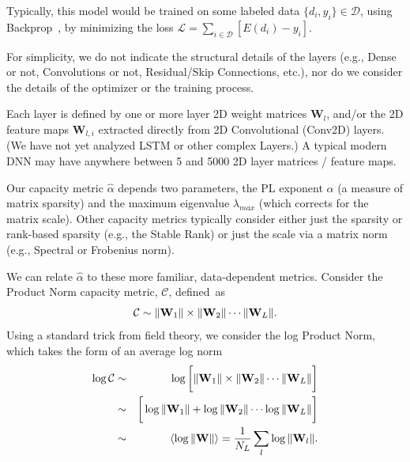 \vspace{-2mm}
Typically, this model would be trained on some labeled data $\{d_{i},y_{i}\}\in\mathcal{D}$, using Backprop~\cite{LBOM12_tricks}, by minimizing the loss $\mathcal{L}=\sum_{i\in\mathcal{D}}[E(d_{i})-y_{i}]$.

For simplicity, we do not indicate the structural details of the layers (e.g., Dense or not, Convolutions or not, Residual/Skip Connections, etc.), nor do we consider the details of the optimizer or the training process.

Each layer is defined by one or more layer 2D weight matrices $\mathbf{W}_{l}$, and/or the 2D feature maps $\mathbf{W}_{l,i}$ extracted directly from 2D Convolutional (Conv2D) layers.
(We have not yet analyzed LSTM or other complex Layers.)   A typical modern DNN may have anywhere between 5 and 5000 2D layer matrices / feature maps.

Our capacity metric $\hat{\alpha}$ depends two parameters, the PL exponent $\alpha$ (a measure of matrix sparsity) and the maximum eigenvalue $\lambda_{max}$ (which corrects for the matrix scale). 
Other capacity metrics typically consider either just the sparsity or rank-based sparsity (e.g., the Stable Rank) or just the scale via a matrix norm (e.g., Spectral or Frobenius norm).

We can relate $\hat{\alpha}$ to these more familiar, data-dependent metrics. 
Consider the Product Norm capacity metric, $\mathcal{C}$, defined~as
\vspace{-3mm}
\begin{equation}
\mathcal{C}\sim\Vert\mathbf{W}_{1}\Vert\times\Vert\mathbf{W}_{2}\Vert\cdots\Vert\mathbf{W}_{L}\Vert   .
\vspace{-1mm}
\end{equation}
Using a standard trick from field theory, we consider the log Product Norm, which takes the form of an average log norm
\vspace{-4mm}
\begin{eqnarray*}
\log\mathcal{C} &\sim& \log\bigg[\Vert\mathbf{W}_{1}\Vert\times\Vert\mathbf{W}_{2}\Vert\cdots\Vert\mathbf{W}_{L}\Vert\bigg]  \\
                &\sim& \bigg[\log\Vert\mathbf{W}_{1}\Vert+\log\Vert\mathbf{W}_{2}\Vert\cdots\log\Vert\mathbf{W}_{L}\Vert\bigg]  \\
                &\sim&  \langle\log\Vert\mathbf{W}\Vert\rangle=\dfrac{1}{N_{L}}\sum_{l}\log\Vert\mathbf{W}_{l}\Vert   .
\vspace{-2mm}
\end{eqnarray*}


